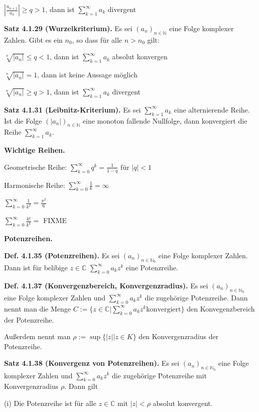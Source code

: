 $\left|\frac{a_{n+1}}{a_n}\right| \ge q > 1$, dann ist $\sum_{k=1}^\infty a_k$ divergent

\textbf{Satz 4.1.29 (Wurzelkriterium).} Es sei $(a_n)_{n\in \mathbb N}$ eine Folge komplexer Zahlen. Gibt es ein $n_0$, so dass für alle $n>n_0$ gilt:

$\sqrt[n]{\vert a_n \vert} \le q<1$, dann ist $\sum_{k=1}^\infty a_k$ absolut konvergen

$\sqrt[n]{\vert a_n \vert} = 1$, dann ist keine Aussage möglich

$\sqrt[n]{\vert a_n \vert} \ge q > 1$, dann ist $\sum_{k=1}^\infty a_k$ divergent

\textbf{Satz 4.1.31 (Leibnitz-Kriterium).} Es sei $\sum_{k=1}^\infty a_k$ eine alternierende Reihe. Ist die Folge $(\vert a_n \vert )_{n \in \mathbb N}$ eine monoton fallende Nullfolge, dann konvergiert die Reihe $\sum_{k=1}^\infty a_k$.

\textbf{Wichtige Reihen.}

Geometrische Reihe: $\sum_{k=0}^\infty q^k = \frac{1}{1-q}$ für $\vert q \vert < 1$

Harmonische Reihe: $\sum_{k=0}^\infty \frac{1}{k} = \infty$

$\sum_{k=0}^\infty \frac{1}{k^2} = \frac{\pi^2}{6}$

$\sum_{k=0}^\infty \frac{k!}{k^k} =$ FIXME

\textbf{Potenzreihen.}

\textbf{Def. 4.1.35 (Potenzreihen).} Es sei $(a_n)_{n \in \mathbb N_0}$ eine Folge komplexer Zahlen. Dann ist für belibige $z \in \mathbb C$ $\sum_{k=0}^\infty a_k z^k$ eine Potenzreihe.

\textbf{Def. 4.1.37 (Konvergenzbereich, Konvergenzradius).} Es sei $(a_n)_{n\in \mathbb N_0}$ eine Folge komplexer Zahlen und $\sum_{k=0}^\infty a_k z^k$ die zugehörige Potenzreihe. Dann nennt man die Menge $C := \{ z \in \mathbb C \vert \sum_{k=0}^\infty a_k z^k \text{konvergiert}\}$ den Konvegenzbereich der Potenzreihe.

Außerdem nennt man $\rho := \sup \{ \vert z\vert \vert z \in K\}$ den Konvergenzradius der Potenzreihe.

\textbf{Satz 4.1.38 (Konvergenz von Potenzreihen).} Es sei $(a_n)_{n\in \mathbb N_0}$ eine Folge komplexer Zahlen und $\sum_{k=0}^\infty a_k z^k$ die zugehörige Potenzreihe mit Konvergenzradius $\rho$. Dann gilt

(i) Die Potenzreihe ist für alle $z\in \mathbb C$ mit $\vert z \vert < \rho$ absolut konvergent.

